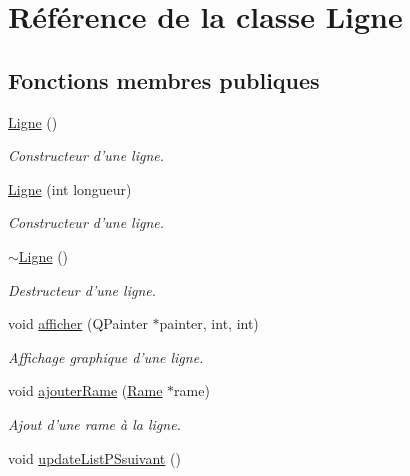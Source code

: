 \hypertarget{classLigne}{
\section{Référence de la classe Ligne}
\label{classLigne}
}
\subsection*{Fonctions membres publiques}
\begin{DoxyCompactItemize}
\item 
\hypertarget{classLigne_aa8953c4b617add4054ed9f73b36995b7}{
\hyperlink{classLigne_aa8953c4b617add4054ed9f73b36995b7}{Ligne} ()}
\label{classLigne_aa8953c4b617add4054ed9f73b36995b7}

\begin{DoxyCompactList}\small\item\em Constructeur d'une ligne. \item\end{DoxyCompactList}\item 
\hyperlink{classLigne_a4c5b5e8f49c5b37724685e2c4799fa60}{Ligne} (int longueur)
\begin{DoxyCompactList}\small\item\em Constructeur d'une ligne. \item\end{DoxyCompactList}\item 
\hypertarget{classLigne_a7496e90cf05bab745e3645919d33c811}{
\hyperlink{classLigne_a7496e90cf05bab745e3645919d33c811}{$\sim$Ligne} ()}
\label{classLigne_a7496e90cf05bab745e3645919d33c811}

\begin{DoxyCompactList}\small\item\em Destructeur d'une ligne. \item\end{DoxyCompactList}\item 
void \hyperlink{classLigne_a548b1d11662e76b5bb05a8a4c1bd96de}{afficher} (QPainter $\ast$painter, int, int)
\begin{DoxyCompactList}\small\item\em Affichage graphique d'une ligne. \item\end{DoxyCompactList}\item 
void \hyperlink{classLigne_a4e6647ba0bf16758fecd57d38266c2f0}{ajouterRame} (\hyperlink{classRame}{Rame} $\ast$rame)
\begin{DoxyCompactList}\small\item\em Ajout d'une rame à la ligne. \item\end{DoxyCompactList}\item 
\hypertarget{classLigne_af11dd876c3d78e3fc9a11d0c91eac46f}{
void \hyperlink{classLigne_af11dd876c3d78e3fc9a11d0c91eac46f}{updateListPSsuivant} ()}
\label{classLigne_af11dd876c3d78e3fc9a11d0c91eac46f}


\end{DoxyCompactItemize}
